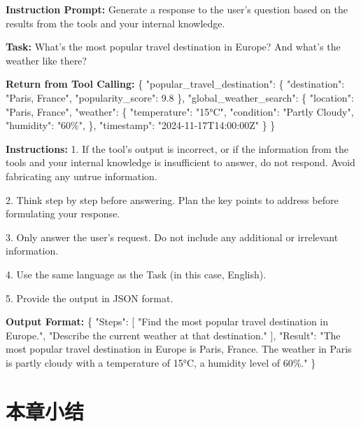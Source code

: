 \begin{center}
\begin{tcolorbox}[colback=bgcolor, colframe=black, width=0.85\textwidth, boxrule=0.5mm, 
coltitle=white, colbacktitle=titlecolor, title=An Example for Response Generation with GPT-4]


\textbf{Instruction Prompt:} Generate a response to the user's question based on the results from the tools and your internal knowledge.

\textbf{Task:} What's the most popular travel destination in Europe? And what's the weather like there?

\textbf{Return from Tool Calling:} 
\{%
    "popular\_travel\_destination": \{%
        "destination": "Paris, France",%
        "popularity\_score": 9.8%
    \},%
    "global\_weather\_search": \{%
        "location": "Paris, France",%
        "weather": \{%
            "temperature": "15°C",%
            "condition": "Partly Cloudy",%
            "humidity": "60\%",%
        \},%
        "timestamp": "2024-11-17T14:00:00Z"%
    \}%
\}

\textbf{Instructions:}
1. If the tool's output is incorrect, or if the information from the tools and your internal knowledge is insufficient to answer, do not respond. Avoid fabricating any untrue information.

2. Think step by step before answering. Plan the key points to address before formulating your response.

3. Only answer the user's request. Do not include any additional or irrelevant information.

4. Use the same language as the Task (in this case, English).

5. Provide the output in JSON format.

\textbf{Output Format:}  
\{%
    "Steps": [%
        "Find the most popular travel destination in Europe.",%
        "Describe the current weather at that destination."%
    ],%
    "Result": "The most popular travel destination in Europe is Paris, France. The weather in Paris is partly cloudy with a temperature of 15°C, a humidity level of 60\%."%
\}

\end{tcolorbox}
\end{center}

\section{本章小结}
\label{sec:summary_chap4}
